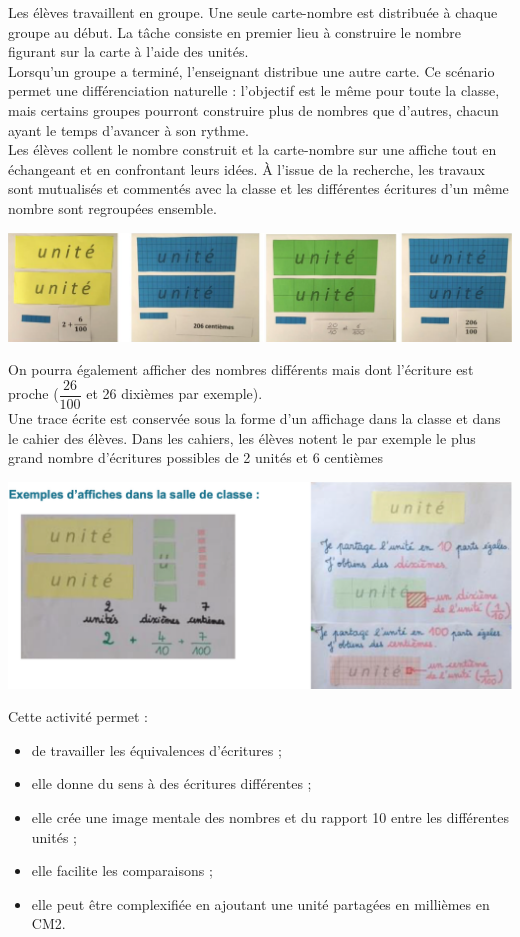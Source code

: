 \begin{exercice*}
Les élèves travaillent en groupe. Une seule carte-nombre est distribuée à chaque groupe au début. La tâche consiste en premier lieu à construire le nombre figurant sur la carte à l’aide des unités. \\
Lorsqu’un groupe a terminé, l’enseignant distribue une autre carte. Ce scénario permet une différenciation naturelle : l’objectif est le même pour toute la classe, mais certains groupes pourront construire plus de nombres que d’autres, chacun ayant le temps d’avancer à son rythme. \\
Les élèves collent le nombre construit et la carte-nombre sur une affiche tout en échangeant et en confrontant leurs idées. À l’issue de la recherche, les travaux sont mutualisés et commentés avec la classe et les différentes écritures d’un même nombre sont regroupées ensemble.
\begin{center}
   \includegraphics[width=17cm]{Nombres_et_calculs_did/Images/Num4_activites_bandes_A2}
\end{center}
On pourra également afficher des nombres différents mais dont l'écriture est proche ($\dfrac{26}{100}$ et 26 dixièmes par exemple). \\
Une trace écrite est conservée sous la forme d’un affichage dans la classe et dans le cahier des élèves. Dans les cahiers, les élèves notent le par exemple le plus grand nombre d’écritures possibles de 2 unités et 6 centièmes
\begin{center}
   \includegraphics[width=17cm]{Nombres_et_calculs_did/Images/Num4_activites_bandes_A3}
\end{center}
Cette activité permet :
\begin{itemize}
   \item de travailler les équivalences d'écritures ;
   \item elle donne du sens à des écritures différentes ;
   \item elle crée une image mentale des nombres et du rapport 10 entre les différentes unités ;
   \item elle facilite les comparaisons ;
   \item elle peut être complexifiée en ajoutant une unité partagées en millièmes en CM2.
\end{itemize}
\end{exercice*}

